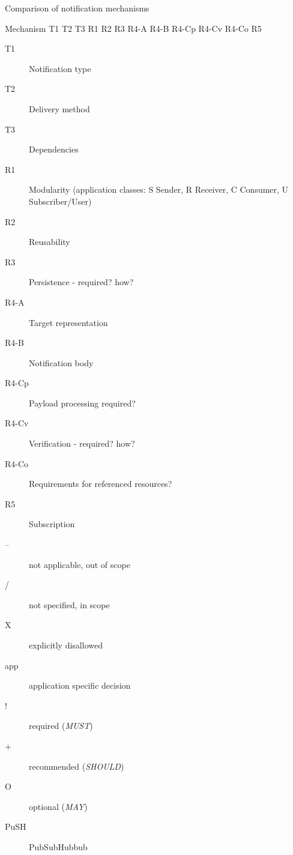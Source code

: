                                     
                                        Comparison of notification mechanisms
                                        
                                            
                                                Mechanism
                                                T1
                                                T2
                                                T3
                                                R1
                                                R2
                                                R3
                                                R4-A
                                                R4-B
                                                R4-Cp
                                                R4-Cv
                                                R4-Co
                                                R5
                                            
                                        
                                        
                                            
                                                
                                                    \begin{description}
  \item[T1] Notification type\item[T2] Delivery method\item[T3] Dependencies\item[R1] Modularity (application classes: S Sender, R Receiver, C Consumer, U Subscriber/User)\item[R2] Reusability\item[R3] Persistence - required? how?\item[R4-A] Target representation\item[R4-B] Notification body\item[R4-Cp] Payload processing required?\item[R4-Cv] Verification - required? how?\item[R4-Co] Requirements for referenced resources?\item[R5] Subscription
    \end{description}
  
                                                    
                                                    \begin{description}
  \item[–] not applicable, out of scope\item[/] not specified, in scope\item[X] explicitly disallowed\item[app] application specific decision\item[!] required ({\em MUST})\item[+] recommended ({\em SHOULD})\item[O] optional ({\em MAY})\item[PuSH] PubSubHubbub
    \end{description}
  
